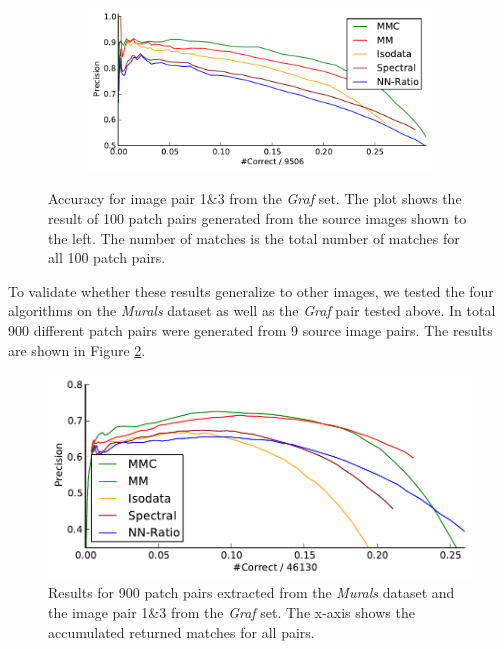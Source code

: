\begin{figure}[htb]
{\begin{subfigure}[t]{.13\textwidth}
		\end{subfigure}%
		~ %
		\begin{subfigure}[t]{.27\textwidth}
   		\centering
   		\includegraphics[width=0.6\columnwidth]{images/result_graf}
		\end{subfigure}%
	}%
	\caption{Accuracy for image pair 1\&3 from the \emph{Graf} set. The plot 
		shows the result of 100 patch pairs generated from the source 
		images shown to the left. The number of matches is the total 
		number of matches for all 100 patch pairs.}
	\label{fig:result_graf}
\end{figure}

To validate whether these results generalize to other images, we tested 
the four algorithms on the \emph{Murals} dataset as well as the 
\emph{Graf} pair tested above.  In total 900 different patch pairs were 
generated from 9 source image pairs.  The results are shown in Figure 
\ref{fig:result_accumulated}. 

\begin{figure}[htb]
	\centering
	\includegraphics[width=\columnwidth]{images/result_accumulated}
	\caption{Results for 900 patch pairs extracted from the 
	\emph{Murals} dataset and the image pair 1\&3 from the \emph{Graf} 
	set.  The x-axis shows the accumulated returned matches for all 
pairs.}
	\label{fig:result_accumulated}
\end{figure}

